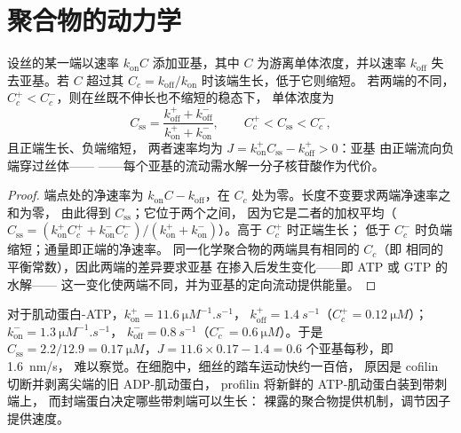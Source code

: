 \section{聚合物的动力学}

\begin{theorem}[临界浓度与踏车行为]\label{thm:b3:cytoskeleton-motility:treadmilling}
设丝的某一端以速率 $k_{\mathrm{on}}C$ 添加亚基，其中
$C$ 为游离单体浓度，并以速率
$k_{\mathrm{off}}$ 失去亚基。若 $C$ 超过其\emph{} $C_{c} = k_{\mathrm{off}}/k_{\mathrm{on}}$ 时该端生长，低于它则缩短。
若两端的不同，$C_{c}^{+}
< C_{c}^{-}$，则在丝既不伸长也不缩短的稳态下，
单体浓度为
\[
C_{\text{ss}} = \frac{k_{\mathrm{off}}^{+} + k_{\mathrm{off}}^{-}}
{k_{\mathrm{on}}^{+} + k_{\mathrm{on}}^{-}},
\qquad C_{c}^{+} < C_{\text{ss}} < C_{c}^{-},
\]
且正端生长、负端缩短，
两者速率均为 $J = k_{\mathrm{on}}^{+}C_{\text{ss}} - k_{\mathrm{off}}^{+} > 0$：亚基
由正端流向负端穿过丝体——\emph{}
——每个亚基的流动需水解一分子核苷酸作为代价。
\end{theorem}
\begin{proof}
端点处的净速率为 $k_{\mathrm{on}}C - k_{\mathrm{off}}$，在
$C_{c}$ 处为零。长度不变要求两端净速率之和为零，
由此得到 $C_{\text{ss}}$；它位于两个之间，
因为它是二者的加权平均（$C_{\text{ss}} =
(k_{\mathrm{on}}^{+}C_{c}^{+} + k_{\mathrm{on}}^{-}C_{c}^{-})/(k_{\mathrm{on}}^{+}
+ k_{\mathrm{on}}^{-})$）。高于 $C_{c}^{+}$ 时正端生长；
低于 $C_{c}^{-}$ 时负端缩短；通量即正端的净速率。
同一化学聚合物的两端具有相同的 $C_{c}$（即
相同的平衡常数），因此两端的差异要求亚基
在掺入后发生变化——即 ATP 或 GTP 的水解——
这一变化使两端不同，并为亚基的定向流动提供能量。
\end{proof}

\begin{example}[肌动蛋白在试管中]\label{ex:b3:cytoskeleton-motility:actin-numbers}
对于肌动蛋白-ATP，$k_{\mathrm{on}}^{+} = \qty{11.6}{\micro M^{-1}.s^{-1}}$，
$k_{\mathrm{off}}^{+} = \qty{1.4}{s^{-1}}$（$C_{c}^{+} = \qty{0.12}{\micro
M}$）；$k_{\mathrm{on}}^{-} = \qty{1.3}{\micro M^{-1}.s^{-1}}$，
$k_{\mathrm{off}}^{-} = \qty{0.8}{s^{-1}}$（$C_{c}^{-} = \qty{0.6}{\micro
M}$）。于是 $C_{\text{ss}} = 2.2/12.9 = \qty{0.17}{\micro M}$，$J =
11.6\times 0.17 - 1.4 = 0.6$ 个亚基每秒，即 \qty{1.6}{nm/s}，
难以察觉。在细胞中，细丝的踏车运动快约一百倍，
原因是 cofilin 切断并剥离尖端的旧 ADP-肌动蛋白，
profilin 将新鲜的 ATP-肌动蛋白装到带刺端上，
而封端蛋白决定哪些带刺端可以生长：
裸露的聚合物提供机制，调节因子提供速度。
\end{example}

